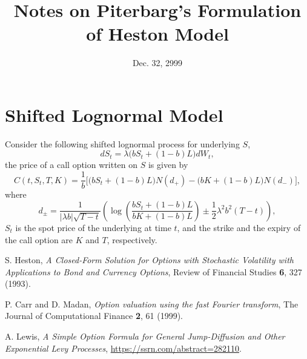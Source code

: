 \documentclass[12pt]{article}
\begin{document}
\title{Notes on Piterbarg's Formulation of Heston Model}
\date{Dec. 32, 2999}

\maketitle

\section{Shifted Lognormal Model}

  Consider the following shifted lognormal process for underlying $S$,
  \begin{equation}
    dS_t=\lambda \bigg(bS_t+\left(1-b\right)L\bigg)dW_t,
  \end{equation}
  the price of a call option written on $S$ is given by
  \begin{equation}
    C(t,S_t,T,K) = \frac{1}{b}\Big[\bigg(bS_t+\left(1-b\right)L\bigg)N\left(d_+\right)
                 - \bigg(bK+\left(1-b\right)L\bigg)N\left(d_-\right)\Big],
  \end{equation}
  where
  \begin{equation}
    d_{\pm} = \frac{1}{\left|\lambda b\right|\sqrt{T-t}}\left(\log\left(\frac{bS_t+\left(1-b\right)L}{bK+\left(1-b\right)L}\right)
            \pm \frac{1}{2}\lambda^2b^2(T-t)\right),
  \end{equation}
  $S_t$ is the spot price of the underlying at time $t$, and the strike and the expiry
  of the call option are $K$ and $T$, respectively.


\begin{thebibliography}{99}
    S. Heston, {\it A Closed-Form Solution for Options with Stochastic Volatility with Applications to Bond and Currency Options}, Review of Financial Studies {\bf 6}, 327 (1993).

    P. Carr and D. Madan, {\it Option valuation using the fast Fourier transform}, The Journal of Computational Finance {\bf 2}, 61 (1999).

    A. Lewis, {\it A Simple Option Formula for General Jump-Diffusion and Other Exponential Levy Processes}, \url{https://ssrn.com/abstract=282110}.

\end{thebibliography}
\end{document}

